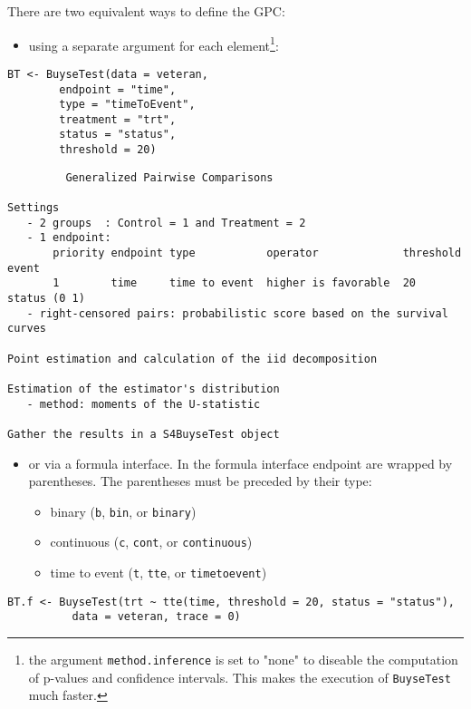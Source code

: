 \documentclass[12pt]{article}
\begin{document}
\bigskip

There are two equivalent ways to define the GPC: 
\begin{itemize}
\item using a separate argument for each element\footnote{the argument
\texttt{method.inference} is set to "none" to diseable the computation of
p-values and confidence intervals. This makes the execution of
\texttt{BuyseTest} much faster.}:
\end{itemize}

\lstset{language=r,label= ,caption= ,captionpos=b,numbers=none}
\begin{lstlisting}
BT <- BuyseTest(data = veteran, 
		endpoint = "time", 
		type = "timeToEvent", 
		treatment = "trt", 
		status = "status", 
		threshold = 20)
\end{lstlisting}

\begin{verbatim}
         Generalized Pairwise Comparisons

Settings 
   - 2 groups  : Control = 1 and Treatment = 2
   - 1 endpoint: 
       priority endpoint type           operator             threshold event       
       1        time     time to event  higher is favorable  20        status (0 1)
   - right-censored pairs: probabilistic score based on the survival curves 

Point estimation and calculation of the iid decomposition

Estimation of the estimator's distribution 
   - method: moments of the U-statistic

Gather the results in a S4BuyseTest object
\end{verbatim}

\clearpage

\begin{itemize}
\item or via a formula interface. In the formula interface endpoint are
wrapped by parentheses. The parentheses must be preceded by their
type: 
\begin{itemize}[label={-}]
\item binary (\texttt{b}, \texttt{bin}, or \texttt{binary})
\item continuous (\texttt{c}, \texttt{cont}, or  \texttt{continuous})
\item time to event (\texttt{t}, \texttt{tte}, or \texttt{timetoevent})
\end{itemize}
\end{itemize}

\lstset{language=r,label= ,caption= ,captionpos=b,numbers=none}
\begin{lstlisting}
BT.f <- BuyseTest(trt ~ tte(time, threshold = 20, status = "status"),
		  data = veteran, trace = 0)
\end{lstlisting}
\end{document}
